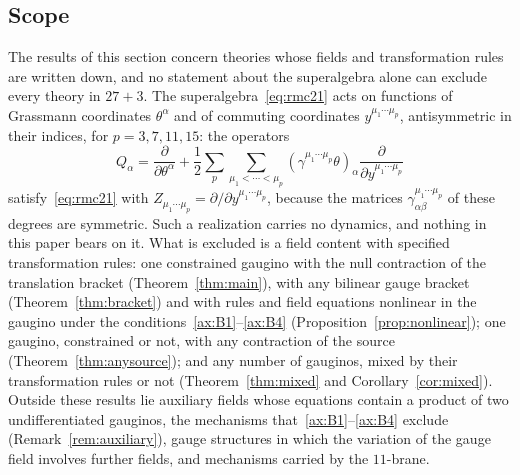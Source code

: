 \subsection{Scope}
\label{ssec:scope}

\begin{remark}
\label{rem:noblanket}
The results of this section concern theories whose fields and transformation rules are written down, and no statement about the superalgebra alone can exclude every theory in $27+3$. The superalgebra~\eqref{eq:rmc21} acts on functions of Grassmann coordinates $\theta^\alpha$ and of commuting coordinates $y^{\mu_1\cdots\mu_p}$, antisymmetric in their indices, for $p=3,7,11,15$: the operators
\[
Q_\alpha=\frac{\partial}{\partial\theta^\alpha}+\frac12\sum_p\sum_{\mu_1<\cdots<\mu_p}(\gamma^{\mu_1\cdots\mu_p}\theta)_\alpha\frac{\partial}{\partial y^{\mu_1\cdots\mu_p}}
\]
satisfy~\eqref{eq:rmc21} with $Z_{\mu_1\cdots\mu_p}=\partial/\partial y^{\mu_1\cdots\mu_p}$, because the matrices $\gamma^{\mu_1\cdots\mu_p}_{\alpha\beta}$ of these degrees are symmetric. Such a realization carries no dynamics, and nothing in this paper bears on it. What is excluded is a field content with specified transformation rules: one constrained gaugino with the null contraction of the translation bracket (Theorem~\ref{thm:main}), with any bilinear gauge bracket (Theorem~\ref{thm:bracket}) and with rules and field equations nonlinear in the gaugino under the conditions~\ref{ax:B1}--\ref{ax:B4} (Proposition~\ref{prop:nonlinear}); one gaugino, constrained or not, with any contraction of the source (Theorem~\ref{thm:anysource}); and any number of gauginos, mixed by their transformation rules or not (Theorem~\ref{thm:mixed} and Corollary~\ref{cor:mixed}). Outside these results lie auxiliary fields whose equations contain a product of two undifferentiated gauginos, the mechanisms that~\ref{ax:B1}--\ref{ax:B4} exclude (Remark~\ref{rem:auxiliary}), gauge structures in which the variation of the gauge field involves further fields, and mechanisms carried by the $11$-brane.
\end{remark}

